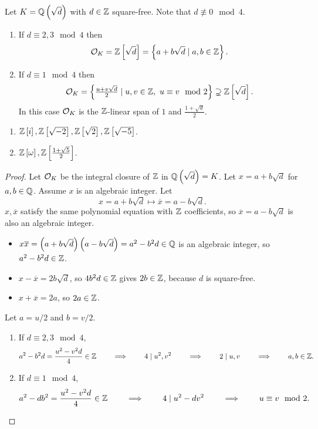 \begin{theorem}
Let $ K = \mathbb{Q}\left( \sqrt{d} \right) $ with $ d \in \mathbb{Z} $ square-free. Note that $ d \not\equiv 0 \mod 4 $.
\begin{enumerate}
\item If $ d \equiv 2, 3 \mod 4 $ then
$$ \mathcal{O}_K = \mathbb{Z}\left[ \sqrt{d} \right] = \left\{ a + b\sqrt{d} \mid a, b \in \mathbb{Z} \right\}. $$
\item If $ d \equiv 1 \mod 4 $ then
$$ \mathcal{O}_K = \left\{ \tfrac{u + v\sqrt{d}}{2} \mid u, v \in \mathbb{Z}, \ u \equiv v \mod 2 \right\} \supsetneq \mathbb{Z}\left[ \sqrt{d} \right]. $$
In this case $ \mathcal{O}_K $ is the $ \mathbb{Z} $-linear span of $ 1 $ and $ \tfrac{1 + \sqrt{d}}{2} $.
\end{enumerate}
\end{theorem}

\begin{example*}
\hfill
\begin{enumerate}
\item $ \mathbb{Z}\left[ i \right], \mathbb{Z}\left[ \sqrt{-2} \right], \mathbb{Z}\left[ \sqrt{2} \right], \mathbb{Z}\left[ \sqrt{-5} \right] $.
\item $ \mathbb{Z}\left[ \omega \right], \mathbb{Z}\left[ \tfrac{1 + \sqrt{5}}{2} \right] $.
\end{enumerate}
\end{example*}

\begin{proof}
Let $ \mathcal{O}_K $ be the integral closure of $ \mathbb{Z} $ in $ \mathbb{Q}\left( \sqrt{d} \right) = K $. Let $ x = a + b\sqrt{d} $ for $ a, b \in \mathbb{Q} $. Assume $ x $ is an algebraic integer. Let
$$ x = a + b\sqrt{d} \mapsto \overline{x} = a - b\sqrt{d}. $$
$ x, \overline{x} $ satisfy the same polynomial equation with $ \mathbb{Z} $ coefficients, so $ \overline{x} = a - b\sqrt{d} $ is also an algebraic integer.
\begin{itemize}
\item $ x\overline{x} = \left( a + b\sqrt{d} \right)\left( a - b\sqrt{d} \right) = a^2 - b^2d \in \mathbb{Q} $ is an algebraic integer, so $ a^2 - b^2d \in \mathbb{Z} $.
\item $ x - \overline{x} = 2b\sqrt{d} $, so $ 4b^2d \in \mathbb{Z} $ gives $ 2b \in \mathbb{Z} $, because $ d $ is square-free.
\item $ x + \overline{x} = 2a $, so $ 2a \in \mathbb{Z} $.
\end{itemize}
Let $ a = u / 2 $ and $ b = v / 2 $.
\begin{enumerate}
\item If $ d \equiv 2, 3 \mod 4 $,
$$ a^2 - b^2d = \dfrac{u^2 - v^2d}{4} \in \mathbb{Z} \qquad \implies \qquad 4 \mid u^2, v^2 \qquad \implies \qquad 2 \mid u, v \qquad \implies \qquad a, b \in \mathbb{Z}. $$
\item If $ d \equiv 1 \mod 4 $,
$$ a^2 - db^2 = \dfrac{u^2 - v^2d}{4} \in \mathbb{Z} \qquad \implies \qquad 4 \mid u^2 - dv^2 \qquad \implies \qquad u \equiv v \mod 2. $$
\end{enumerate}
\end{proof}


